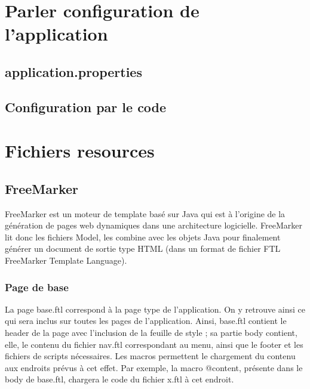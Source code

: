 	\section{Parler configuration de l'application}

		\subsection{application.properties}


		\subsection{Configuration par le code}


	\section{Fichiers resources}

		\subsection{FreeMarker}
			FreeMarker est un moteur de template basé sur Java qui est à l'origine de la génération de pages web dynamiques dans une architecture logicielle.\newline
			FreeMarker lit donc les fichiers Model, les combine avec les objets Java pour finalement générer un document de sortie type HTML (dans un format de fichier FTL FreeMarker Template Language).

			\subsubsection{Page de base}

				La page base.ftl correspond à la page type de l'application. On y retrouve ainsi ce qui sera inclus sur toutes les pages de l'application. \newline
				Ainsi, base.ftl contient le header de la page avec l'inclusion de la feuille de style ; sa partie body contient, elle, le contenu du fichier nav.ftl correspondant au menu, ainsi que le footer et les fichiers de scripts nécessaires.\newline
				Les macros permettent le chargement du contenu aux endroits prévus à cet effet. Par exemple, la macro @content, présente dans le body de base.ftl, chargera le code du fichier x.ftl à cet endroit.

